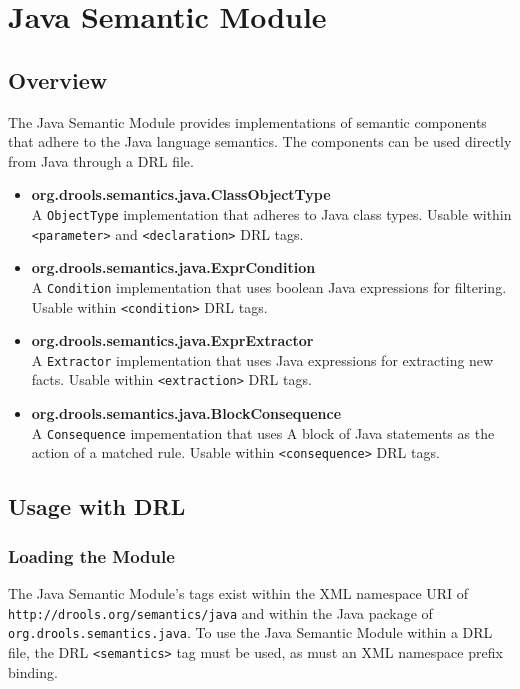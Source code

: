 \chapter{Java Semantic Module}

\section{Overview}

The Java Semantic Module provides implementations of semantic
components that adhere to the Java language semantics.  The components
can be used directly from Java through a DRL file.


\begin{itemize}
	\item \textbf{\textsf{org.drools.semantics.java.ClassObjectType}}\\
		A \verb|ObjectType| implementation that adheres
		to Java class types.  Usable within \verb|<parameter>|
		and \verb|<declaration>| DRL tags.
	\item \textbf{\textsf{org.drools.semantics.java.ExprCondition}}\\
		A \verb|Condition| implementation that uses boolean
		Java expressions for filtering. Usable within 
		\verb|<condition>| DRL tags.
	\item \textbf{\textsf{org.drools.semantics.java.ExprExtractor}}\\
		A \verb|Extractor| implementation that uses Java
		expressions for extracting new facts.  Usable
		within \verb|<extraction>| DRL tags.
	\item \textbf{\textsf{org.drools.semantics.java.BlockConsequence}}\\
		A \verb|Consequence| impementation that uses
		A block of Java statements as the action of a
		matched rule.  Usable within \verb|<consequence>|
		DRL tags.
\end{itemize}

\clearpage

\section{Usage with DRL}

\subsection{Loading the Module}

The Java Semantic Module's tags exist within the XML namespace
URI of \verb|http://drools.org/semantics/java| and within the
Java package of\\ \verb|org.drools.semantics.java|.  To use the
Java Semantic Module within a DRL file, the DRL \verb|<semantics>|
tag must be used, as must an XML namespace prefix binding.

